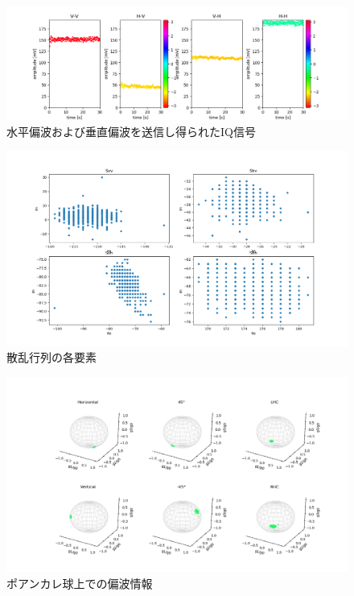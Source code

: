 \documentclass[uplatex,a4paper,10pt]{jsarticle}
\begin{document}
\begin{figure}[hbtp]
	\centering
	\includegraphics[scale=0.6]{../img/20220707_test_1_AmPh4_2Tx2Rx.png}
    \caption{水平偏波および垂直偏波を送信し得られたIQ信号}
	\label{fig:iq}
\end{figure}
\begin{figure}[hbtp]
	\centering
	\includegraphics[scale=0.4]{../img/20220707_test_1_IQ4_2Tx2Rx.png}
    \caption{散乱行列の各要素}
	\label{fig:scatter}
\end{figure}
\begin{figure}[hbtp]
	\centering
	\includegraphics[scale=0.4]{../img/20220707_test_1_PS_2.png}
    \caption{ポアンカレ球上での偏波情報}
	\label{fig:ps}
\end{figure}
\end{document}
